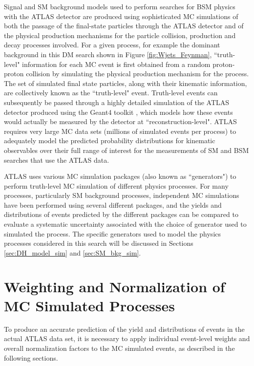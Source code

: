 Signal and SM background models used to perform searches for BSM physics with the ATLAS detector are produced using sophisticated MC simulations of both the passage of the final-state particles through the ATLAS detector and of the physical production mechanisms for the particle collision, production and decay processes involved. For a given process, for example the dominant \wjets background in this DM search shown in Figure \ref{fig:Wjets_Feynman}, ``truth-level" information for each MC event is first obtained from a random proton-proton collision by simulating the physical production mechanism for the process. The set of simulated final state particles, along with their kinematic information, are collectively known as the ``truth-level" event. Truth-level events can subsequently be passed through a highly detailed  simulation of the ATLAS detector \cite{atlas_sim} produced using the Geant4 toolkit \cite{Geant4}, which models how these events would actually be measured by the detector at ``reconstruction-level". ATLAS requires very large MC data sets (millions of simulated events per process) to adequately model the predicted probability distributions for kinematic observables over their full range of interest for the measurements of SM and BSM searches that use the ATLAS data.

ATLAS uses various MC simulation packages (also known as ``generators") to perform truth-level MC simulation of different physics processes. For many processes, particularly SM background processes, independent MC simulations have been performed using several different packages, and the yields and distributions of events predicted by the different packages can be compared to evaluate a systematic uncertainty associated with the choice of generator used to simulated the process. The specific generators used to model the physics processes considered in this search will be discussed in Sections \ref{sec:DH_model_sim} and \ref{sec:SM_bkg_sim}.

\section{Weighting and Normalization of MC Simulated Processes}

To produce an accurate prediction of the yield and distributions of events in the actual ATLAS data set, it is necessary to apply individual event-level weights and overall normalization factors to the MC simulated events, as described in the following sections.

